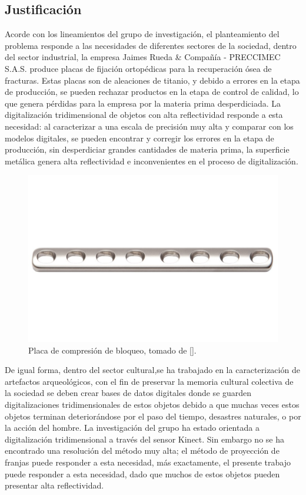 \documentclass[UTF8]{article}
\begin{document}
\subsection{Justificación}
%
Acorde con los lineamientos del grupo de investigación, el planteamiento del problema responde a las necesidades de diferentes sectores de la sociedad, dentro del sector industrial, la empresa Jaimes Rueda \& Compañía - PRECCIMEC S.A.S. produce placas de fijación ortopédicas para la recuperación ósea de fracturas. Estas placas son de aleaciones de titanio, y debido a errores en la etapa de producción, se pueden rechazar productos en la etapa de control de calidad, lo que genera pérdidas para la empresa por la materia prima desperdiciada.
%
La digitalización tridimensional de objetos con alta reflectividad responde a esta necesidad: al caracterizar a una escala de precisión muy alta y comparar con los modelos digitales, se pueden encontrar y corregir los errores en la etapa de producción, sin desperdiciar grandes cantidades de materia prima, la superficie metálica genera alta reflectividad e inconvenientes en el proceso de digitalización.

\begin{figure}[h!]
\includegraphics[width=12cm]{lcp.jpg}
\centering
\caption{Placa de compresión de bloqueo, tomado de [].}
\label{im5}
\end{figure}
\medskip

De igual forma, dentro del sector cultural,se ha trabajado en la caracterización de artefactos arqueológicos, con el fin de preservar la memoria cultural colectiva de la sociedad se deben crear bases de datos digitales donde se guarden digitalizaciones tridimensionales de estos objetos debido a que muchas veces estos objetos terminan deteriorándose por el paso del tiempo, desastres naturales, o por la acción del hombre.
%
La investigación del grupo ha estado orientada a digitalización tridimensional a través del sensor Kinect. Sin embargo no se ha encontrado una resolución del método muy alta; el método de proyección de franjas puede responder a esta necesidad, más exactamente, el presente trabajo puede responder a esta necesidad, dado que muchos de estos objetos pueden presentar alta reflectividad.
%
\end{document}
